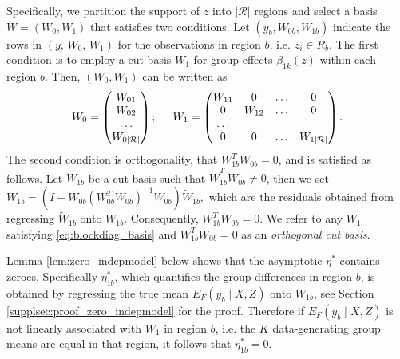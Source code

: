 Specifically, we partition the support of $z$ into $|\mathcal{R}|$ regions and select a basis $W=(W_0,W_1)$ that satisfies two conditions.
Let $(y_b, W_{0b}, W_{1b})$ indicate the rows in $(y,\, W_0,\, W_1)$ for the observations in region $b$, i.e. $z_i \in R_b$.
The first condition is to employ a cut basis $W_1$ for group effects $\beta_{1k}(z)$ within each region $b$.
Then, $(W_0,W_1)$ can be written as
\begin{align} 
W_0= \begin{pmatrix} W_{01} \\ W_{02} \\ \ldots \\ W_{0|\mathcal{R}|} \end{pmatrix}
; \hspace{5mm}
W_1= \begin{pmatrix} 
W_{11} & 0 & \ldots &  0 \\
0 & W_{12} & \ldots & 0 \\
\ldots & & & \\
0 & 0 & \ldots & W_{1|\mathcal{R}|}
\end{pmatrix}.
\label{eq:blockdiag_basis}
\end{align}
The second condition is orthogonality, that $W_{1b}^T W_{0b}=0$, and is satisfied as follows. Let $\widetilde{W}_{1b}$ be a cut basis
such that $\widetilde{W}_{1b}^T W_{0b} \neq 0$, then we set
$
W_{1b}= (I - W_{0b} (W_{0b}^T W_{0b})^{-1} W_{0b}) \widetilde{W}_{1b},
$
which are the residuals obtained from regressing $\widetilde{W}_{1b}$ onto $W_{1b}$. Consequently,  $W_{1b}^T W_{0b}=0$.
We refer to  any $W_1$ satisfying \eqref{eq:blockdiag_basis} and $W_{1b}^T W_{0b}=0$ as an {\it orthogonal cut basis}.

Lemma \ref{lem:zero_indepmodel} below shows that the asymptotic $\eta^*$ contains zeroes. Specifically $\eta_{1b}^*$, which quantifies the group differences in region $b$,  is obtained by regressing the true mean $E_F(y_b \mid X,Z)$ onto $W_{1b}$, see Section \ref{supplsec:proof_zero_indepmodel} for the proof. 
Therefore if $E_F(y_b \mid X,Z)$ is not linearly associated with $W_1$ in region $b$, i.e. the $K$ data-generating group means are equal in that region, it follows that $\eta_{1b}^*=0$.



